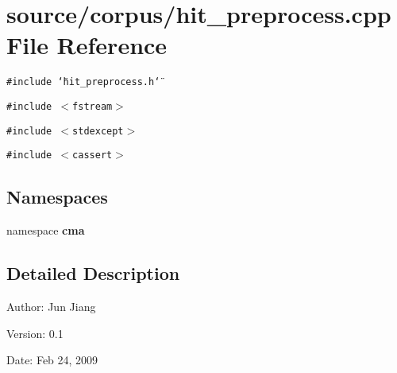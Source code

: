 \section{source/corpus/hit\_\-preprocess.cpp File Reference}
\label{hit__preprocess_8cpp}
{\tt \#include \char`\"{}hit\_\-preprocess.h\char`\"{}}\par
{\tt \#include $<$fstream$>$}\par
{\tt \#include $<$stdexcept$>$}\par
{\tt \#include $<$cassert$>$}\par
\subsection*{Namespaces}
\begin{CompactItemize}
\item 
namespace \textbf{cma}
\end{CompactItemize}


\subsection{Detailed Description}
\begin{Desc}
\item[Author:]Jun Jiang \end{Desc}
\begin{Desc}
\item[Version:]0.1 \end{Desc}
\begin{Desc}
\item[Date:]Feb 24, 2009 \end{Desc}
